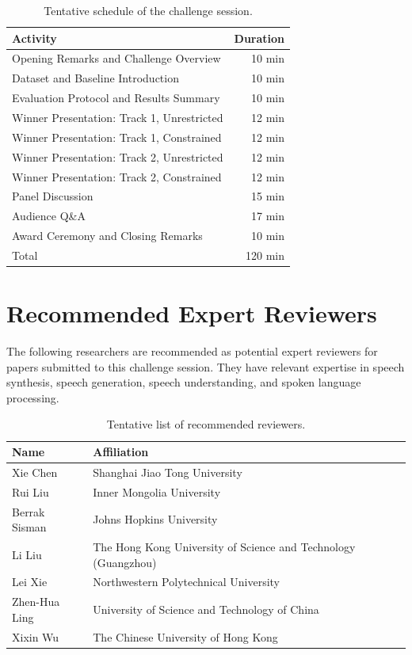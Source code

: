 \documentclass[a4paper]{article}
\begin{document}
\begin{table}[h]
\caption{Tentative schedule of the challenge session.}
\label{tab:session_schedule}
\centering
\begin{tabular}{lr}
\toprule
\textbf{Activity} & \textbf{Duration} \\
\midrule
Opening Remarks and Challenge Overview & 10 min \\
Dataset and Baseline Introduction & 10 min \\
Evaluation Protocol and Results Summary & 10 min \\
Winner Presentation: Track 1, Unrestricted & 12 min \\
Winner Presentation: Track 1, Constrained & 12 min \\
Winner Presentation: Track 2, Unrestricted & 12 min \\
Winner Presentation: Track 2, Constrained & 12 min \\
Panel Discussion & 15 min \\
Audience Q\&A & 17 min \\
Award Ceremony and Closing Remarks & 10 min \\
\midrule
Total & 120 min \\
\bottomrule
\end{tabular}
\end{table}


\section{Recommended Expert Reviewers}

The following researchers are recommended as potential expert reviewers for papers submitted to this challenge session. They have relevant expertise in speech synthesis, speech generation, speech understanding, and spoken language processing.


\begin{table}[h]
\caption{Tentative list of recommended reviewers.}
\label{tab:reviewers}
\centering
\small
\begin{tabularx}{\linewidth}{@{}lX@{}}
\toprule
\textbf{Name} & \textbf{Affiliation} \\
\midrule
Xie Chen & Shanghai Jiao Tong University \\
Rui Liu & Inner Mongolia University \\
Berrak Sisman & Johns Hopkins University \\
Li Liu & The Hong Kong University of Science and Technology (Guangzhou) \\
Lei Xie & Northwestern Polytechnical University \\
Zhen-Hua Ling & University of Science and Technology of China \\
Xixin Wu & The Chinese University of Hong Kong \\
\bottomrule
\end{tabularx}
\end{table}
\end{document}
